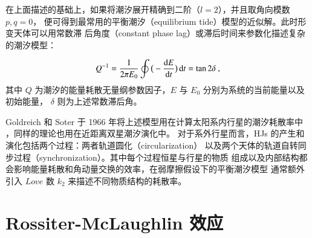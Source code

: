 在上面描述的基础上，如果将潮汐展开精确到二阶（$l=2$），并且取角向模数$p,q = 0 $，
便可得到最常用的平衡潮汐（equilibrium tide）模型的近似解。此时形变天体可以用常数滞
后角度（constant phase lag）或滞后时间来参数化描述复杂的潮汐模型：

\begin{equation} \label{eq:eqtide}
Q^{-1}=\frac{1}{2\pi E_0} \oint \big( -\frac{\mathrm{d} E}{\mathrm{d} t}\big)\,\mathrm{d} t = \tan 2\delta \ ,
\end{equation} 
其中 $Q$ 为潮汐的能量耗散无量纲参数因子，$E$ 与 $E_0$ 分别为系统的当前能量以及初始能量，
$\delta$ 则为上述常数滞后角。

Goldreich 和 Soter 于 1966 年将上述模型用在计算太阳系内行星的潮汐耗散率中
\cite{Goldreich1966}，同样的理论也用在近距离双星潮汐演化中\cite{Hut1981,Zahn1977}。
对于系外行星而言，HJs 的产生和演化包括两个过程：两者轨道圆化（circularization）
以及两个天体的轨道自转同步过程（synchronization）。其中每个过程恒星与行星的物质
组成以及内部结构都会影响能量耗散和角动量交换的效率，在弱摩擦假设下的平衡潮汐模型
通常额外引入 $Love$ 数 $k_2$ 来描述不同物质结构的耗散率。


\section{Rossiter-McLaughlin 效应} \label{sec:rmeffect}

